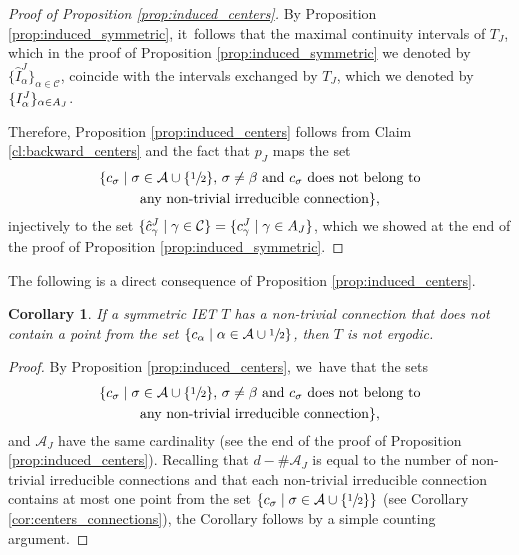 \documentclass[JEP,XML,SOM,Unicode,NoEqCountersInSection,NoFloatCountersInSection,published]{cedram}
\theoremstyle{plain}
\newtheorem{corollary}[theorem]{Corollary}
\theoremstyle{definition}
\newcommand{\A}{\mathcal{A}}
\begin{document}
\begin{proof}[Proof of Proposition \ref{prop:induced_centers}]
By Proposition \ref{prop:induced_symmetric}, it~follows that the maximal continuity intervals of $T_J$, which in the proof of Proposition \ref{prop:induced_symmetric} we denoted by $\{\hat I^J_{\alpha}\}_{\alpha\in\mathcal C}$, coincide with the intervals exchanged by $T_J$, which we denoted by $\{I^J_{\alpha}\}_{\alpha\in\mathcal \A_J}$.

Therefore, Proposition \ref{prop:induced_centers} follows from Claim \ref{cl:backward_centers} and the fact that $p_J$ maps the set
\begin{multline*}
\{c _\sigma \mid \sigma \in \A \cup \{\sfrac{1}{2}\},\, \sigma \neq \beta \text{ and } c_\sigma \text{ does not belong to}\\
\text{any non-trivial irreducible connection}\},
\end{multline*}
injectively to the set $\{\hat c_\gamma^J \mid \gamma \in \mathcal C\} = \{c_\gamma^J \mid \gamma \in \mathcal \A_J\}$, which we showed at the end of the proof of Proposition \ref{prop:induced_symmetric}.
\end{proof}

The following is a direct consequence of Proposition \ref{prop:induced_centers}.

\begin{corollary}\label{cor: emptyconnection}
If a symmetric IET $T$ has a non-trivial connection that does not contain a point from the set $\{c_{\alpha} \mid \alpha \in \A \cup \sfrac{1}{2}\}$, then $T$ is not ergodic.
\end{corollary}
{

\begin{proof} By Proposition \ref{prop:induced_centers}, we~have that the sets
\begin{multline*}
\{c _\sigma \mid \sigma \in \A \cup \{\sfrac{1}{2}\},\, \sigma \neq \beta \text{ and } c_\sigma \text{ does not belong to}\\
\text{any non-trivial irreducible connection}\},
\end{multline*}
and $\A_J$
have the same cardinality (see the end of the proof of Proposition \ref{prop:induced_centers}). Recalling that $d-\#\A_J$ is equal to the number of non-trivial irreducible connections and that each non-trivial irreducible connection contains at most one point from the set $\{c _\sigma \mid \sigma \in \A \cup \{\sfrac{1}{2}\}\} $ (see Corollary \ref{cor:centers_connections}), the Corollary follows by a simple counting argument.
\end{proof}}
\end{document}
